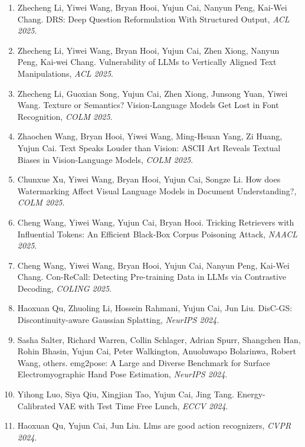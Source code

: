 \begin{enumerate}
\item Zhecheng Li, Yiwei Wang, Bryan Hooi, Yujun Cai, Nanyun Peng, Kai-Wei Chang. DRS: Deep Question Reformulation With Structured Output, \textit{ACL 2025}.

\item Zhecheng Li, Yiwei Wang, Bryan Hooi, Yujun Cai, Zhen Xiong, Nanyun Peng, Kai-wei Chang. Vulnerability of LLMs to Vertically Aligned Text Manipulations, \textit{ACL 2025}.

\item Zhecheng Li, Guoxian Song, Yujun Cai, Zhen Xiong, Junsong Yuan, Yiwei Wang. Texture or Semantics? Vision-Language Models Get Lost in Font Recognition, \textit{COLM 2025}.

\item Zhaochen Wang, Bryan Hooi, Yiwei Wang, Ming-Hsuan Yang, Zi Huang, Yujun Cai. Text Speaks Louder than Vision: ASCII Art Reveals Textual Biases in Vision-Language Models, \textit{COLM 2025}.

\item Chunxue Xu, Yiwei Wang, Bryan Hooi, Yujun Cai, Songze Li. How does Watermarking Affect Visual Language Models in Document Understanding?, \textit{COLM 2025}.

\item Cheng Wang, Yiwei Wang, Yujun Cai, Bryan Hooi. Tricking Retrievers with Influential Tokens: An Efficient Black-Box Corpus Poisoning Attack, \textit{NAACL 2025}.

\item Cheng Wang, Yiwei Wang, Bryan Hooi, Yujun Cai, Nanyun Peng, Kai-Wei Chang. Con-ReCall: Detecting Pre-training Data in LLMs via Contrastive Decoding, \textit{COLING 2025}.

\item Haoxuan Qu, Zhuoling Li, Hossein Rahmani, Yujun Cai, Jun Liu. DisC-GS: Discontinuity-aware Gaussian Splatting, \textit{NeurIPS 2024}.

\item Sasha Salter, Richard Warren, Collin Schlager, Adrian Spurr, Shangchen Han, Rohin Bhasin, Yujun Cai, Peter Walkington, Anuoluwapo Bolarinwa, Robert Wang, others. emg2pose: A Large and Diverse Benchmark for Surface Electromyographic Hand Pose Estimation, \textit{NeurIPS 2024}.

\item Yihong Luo, Siya Qiu, Xingjian Tao, Yujun Cai, Jing Tang. Energy-Calibrated VAE with Test Time Free Lunch, \textit{ECCV 2024}.

\item Haoxuan Qu, Yujun Cai, Jun Liu. Llms are good action recognizers, \textit{CVPR 2024}.


\end{enumerate}

